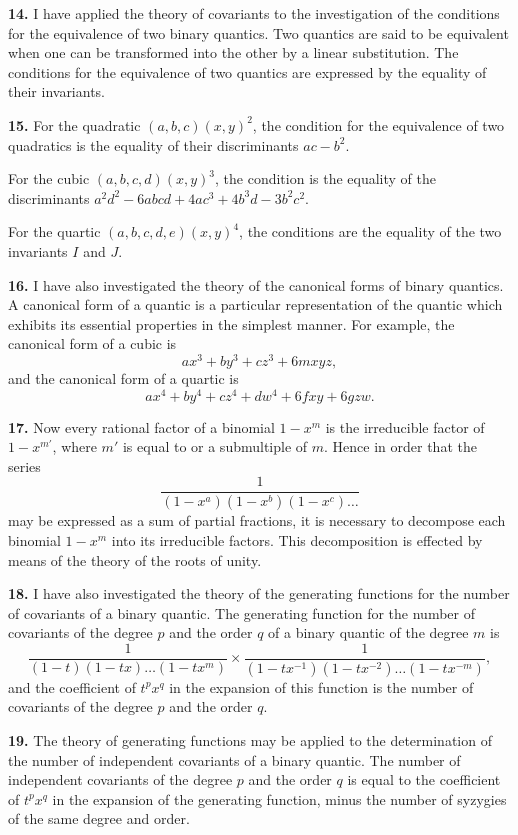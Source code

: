 \documentclass[12pt,a4paper]{article}
\begin{document}
\newpage
\setcounter{page}{252}

\textbf{14.} I have applied the theory of covariants to the investigation of the conditions for the equivalence of two binary quantics. Two quantics are said to be equivalent when one can be transformed into the other by a linear substitution. The conditions for the equivalence of two quantics are expressed by the equality of their invariants.

\textbf{15.} For the quadratic $(a, b, c)(x, y)^2$, the condition for the equivalence of two quadratics is the equality of their discriminants $ac - b^2$.

For the cubic $(a, b, c, d)(x, y)^3$, the condition is the equality of the discriminants $a^2d^2 - 6abcd + 4ac^3 + 4b^3d - 3b^2c^2$.

For the quartic $(a, b, c, d, e)(x, y)^4$, the conditions are the equality of the two invariants $I$ and $J$.

\textbf{16.} I have also investigated the theory of the canonical forms of binary quantics. A canonical form of a quantic is a particular representation of the quantic which exhibits its essential properties in the simplest manner. For example, the canonical form of a cubic is
\[
ax^3 + by^3 + cz^3 + 6mxyz,
\]
and the canonical form of a quartic is
\[
ax^4 + by^4 + cz^4 + dw^4 + 6fxy + 6gzw.
\]

\newpage
\setcounter{page}{253}

\textbf{17.} Now every rational factor of a binomial $1 - x^m$ is the irreducible factor of $1 - x^{m'}$, where $m'$ is equal to or a submultiple of $m$. Hence in order that the series
\[
\frac{1}{(1-x^a)(1-x^b)(1-x^c)\ldots}
\]
may be expressed as a sum of partial fractions, it is necessary to decompose each binomial $1 - x^m$ into its irreducible factors. This decomposition is effected by means of the theory of the roots of unity.

\textbf{18.} I have also investigated the theory of the generating functions for the number of covariants of a binary quantic. The generating function for the number of covariants of the degree $p$ and the order $q$ of a binary quantic of the degree $m$ is
\[
\frac{1}{(1-t)(1-tx)\ldots(1-tx^m)} \times \frac{1}{(1-tx^{-1})(1-tx^{-2})\ldots(1-tx^{-m})},
\]
and the coefficient of $t^p x^q$ in the expansion of this function is the number of covariants of the degree $p$ and the order $q$.

\newpage
\setcounter{page}{254}

\textbf{19.} The theory of generating functions may be applied to the determination of the number of independent covariants of a binary quantic. The number of independent covariants of the degree $p$ and the order $q$ is equal to the coefficient of $t^p x^q$ in the expansion of the generating function, minus the number of syzygies of the same degree and order.
\end{document}
